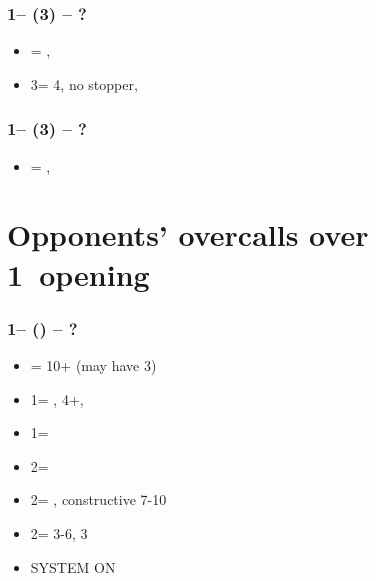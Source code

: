 \documentclass[12pt, a4paper]{report}
\begin{document}
{{{            \subsubsection*{1\diams -- (3\hearts) -- ?}
            \begin{itemize}
                \item \dbl = \spades, \gf
                \item 3\spades = 4\spades, no \hearts stopper, \gf
            \end{itemize}

            \subsubsection*{1\diams -- (3\spades) -- ?}
            \begin{itemize}
                \item \dbl = \hearts, \gf
            \end{itemize}

        }

        \section*{\colorbox{blue!30}{Opponents' overcalls over 1\hearts\ opening}}
         {
        
            \subsubsection*{1\hearts -- (\dbl) -- ?}
            \begin{itemize}
                \item \rdbl = 10+ (may have 3\hearts)
                \item 1\spades = \nat, 4+\spades, \fonce
                \item 1\nt = \trsf{2\clubs}
                \item 2\clubs = \trsf{2\diams}
                \item 2\diams = \trsf{2\hearts}, constructive 7-10
                \item 2\hearts = 3-6, 3\hearts
                \item \small{SYSTEM ON}
            \end{itemize}

}}}
\end{document}
